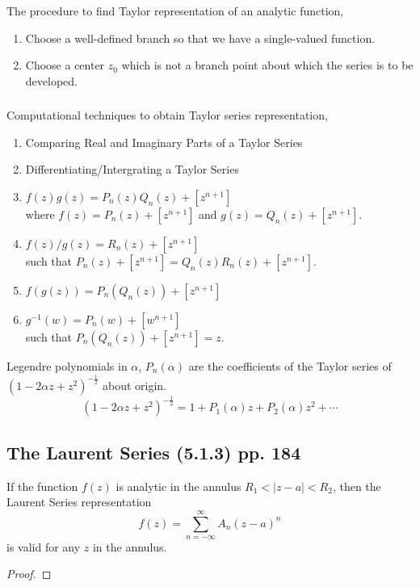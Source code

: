 \subsubsection*{}
The procedure to find Taylor representation of an analytic function,
\begin{enumerate}
	\item Choose a well-defined branch so that we have a single-valued function.
	\item Choose a center $z_0$ which is not a branch point about which the series is to be developed.
\end{enumerate}

\subsubsection*{}
Computational techniques to obtain Taylor series representation,
\begin{enumerate}
	\item Comparing Real and Imaginary Parts of a Taylor Series
	\item Differentiating/Intergrating a Taylor Series
	\item $f(z)g(z) = P_n(z)Q_n(z) + [z^{n+1}]$ \\ where $f(z) = P_n(z) + [z^{n+1}]$ and $g(z) = Q_n(z) + [z^{n+1}]$.
	\item $f(z)/g(z) = R_n(z) + [z^{n+1}]$\\ such that $P_n(z) + [z^{n+1}] = Q_n(z)R_n(z) + [z^{n+1}]$.
	\item $f(g(z)) = P_n(Q_n(z)) + [z^{n+1}]$
	\item $g^{-1}(w) = P_n(w) + [w^{n+1}]$ \\ such that $P_n(Q_n(z)) + [z^{n+1}] = z$.
\end{enumerate}

\begin{definition}
	Legendre polynomials in $\alpha$, $P_n(\alpha)$ are the coefficients of the Taylor series of $(1-2\alpha z + z^2)^{-\frac{1}{2}}$ about origin.
	\begin{equation}
		(1-2\alpha z + z^2)^{-\frac{1}{2}} = 1 + P_1(\alpha)z + P_2(\alpha)z^2+\dotsb
	\end{equation}
\end{definition}

\subsection{The Laurent Series (5.1.3) pp. 184}
\begin{remark}
	If the function $f(z)$ is analytic in the annulus $R_1 < |z-a| < R_2$, then the Laurent Series representation
	\begin{equation}
		f(z) = \sum_{n = -\infty}^\infty A_n (z-a)^n
	\end{equation}
	is valid for any $z$ in the annulus.
\end{remark}
\begin{proof}
\end{proof}

